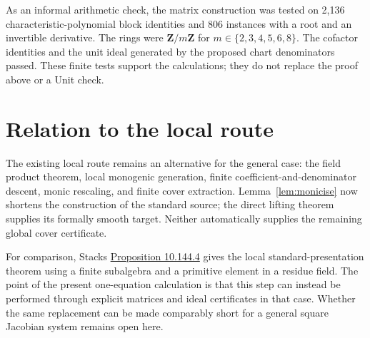 \documentclass[11pt]{article}
\begin{document}
As an informal arithmetic check, the matrix construction was tested
on 2,136 characteristic-polynomial block identities and 806 instances
with a root and an invertible derivative. The rings were
$\mathbf Z/m\mathbf Z$ for $m\in\{2,3,4,5,6,8\}$. The cofactor identities and
the unit ideal generated by the proposed chart denominators passed.
These finite tests support the calculations; they do not replace the
proof above or a Unit check.

\section{Relation to the local route}

The existing local route remains an alternative for the general case:
the field product theorem, local monogenic generation, finite
coefficient-and-denominator descent, monic rescaling, and finite
cover extraction. Lemma~\ref{lem:monicise} now shortens the construction
of the standard source; the direct lifting theorem supplies its
formally smooth target. Neither automatically supplies the remaining
global cover certificate.

For comparison, Stacks
\href{https://stacks.math.columbia.edu/tag/00UE}{Proposition 10.144.4}
gives the local standard-presentation theorem using a finite
subalgebra and a primitive element in a residue field. The point of
the present one-equation calculation is that this step can instead
be performed through explicit matrices and ideal certificates in
that case. Whether the same replacement can be made comparably
short for a general square Jacobian system remains open here.
\end{document}
